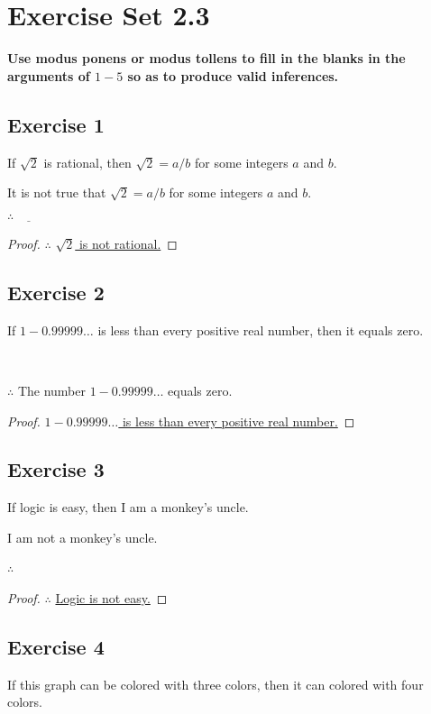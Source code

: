 \documentclass[14pt]{extarticle}
\newcommand{\fbl}{\underline{\hspace{1cm}}\,\,}
\begin{document}
\section{Exercise Set 2.3}

 {\bf \color{cyan} Use modus ponens or modus tollens to fill in the blanks in the arguments of $1-5$ so as to produce valid inferences.}

\subsection{Exercise 1}
If $\sqrt{2}$ is rational, then $\sqrt{2} = a / b$ for some integers $a$ and $b$.

It is not true that $\sqrt{2} = a / b$ for some integers $a$ and $b$.

$\therefore \fbl$

\begin{proof}
    $\therefore$ \underline{$\sqrt{2}$ is not rational.}
\end{proof}

\subsection{Exercise 2}
If $1 - 0.99999\ldots$ is less than every positive real number, then it equals zero.

\fbl

$\therefore$ The number $1 - 0.99999\ldots$ equals zero.

\begin{proof}
    \underline{$1 - 0.99999\ldots$ is less than every positive real number.}
\end{proof}

\subsection{Exercise 3}
If logic is easy, then I am a monkey’s uncle.

I am not a monkey’s uncle.

$\therefore$ \fbl

\begin{proof}
    $\therefore$ \underline{Logic is not easy.}
\end{proof}

\subsection{Exercise 4}
If this graph can be colored with three colors, then it can colored with four colors.
\end{document}
